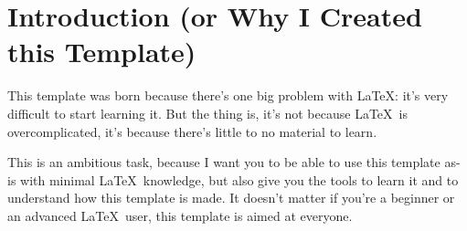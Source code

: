 \section{Introduction (or Why I Created this Template)}
  This template was born because there's one big problem with \LaTeX: it's very difficult to start
  learning it.
  But the thing is, it's not because \LaTeX\ is overcomplicated, it's because there's little to no
  material to learn.

  This is an ambitious task, because I want you to be able to use this template as-is with minimal
  \LaTeX\ knowledge, but also give you the tools to learn it and to understand how this template is
  made.
  It doesn't matter if you're a beginner or an advanced \LaTeX\ user, this template is aimed at 
  everyone.